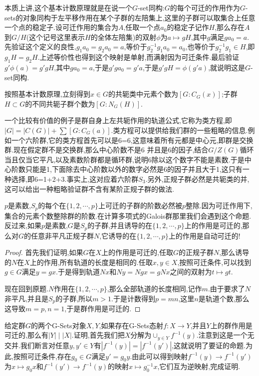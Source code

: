 本质上讲,这个基本计数原理就是在说一个$G$-set同构:$G$的每个可迁的作用作为$G$-sets的对象同构于左平移作用在某个子群的左陪集上,这里的子群可以取集合上任意一个点的稳定子.设可迁作用的集合为$A$,任取一个点$a_0$的稳定子记作$H$,那么存在$A$到$G/H$(这个记号这里表示$H$的全体左陪集)的双射$\phi$为$a\mapsto gH$,其中$g$满足$ga_0=a$.先验证这个定义的良性,$g_1a_0=g_2a_0=a$,等价于$g_2^{-1}g_1a_0=a_0$,也等价于$g_2^{-1}g_1\in H$,即$g_1H=g_2H$.上述等价性也得到这个映射是单射,而满射因为可迁条件.最后验证$g'\phi(a)=g'gH$,其中$ga_0=a$,于是$g'ga_0=g'a$,于是$g'gH=\phi(g'a)$,就说明这是$G$-set同构.

按照基本计数原理,立刻得到$x\in G$的共轭类中元素个数为$[G:C_G(x)]$;子群$H\subset G$的不同共轭子群个数为$[G:N_G(H)]$.

一个比较有价值的例子是群自身上左共轭作用的轨道公式,它称为类方程,即$|G|=|C(G)|+\sum[G:C_G(a)]$.类方程可以提供给我们群的一些粗略的信息.例如一个六阶群,它的类方程首先可以是6=6,这意味着所有元都是中心元,即群是交换群.现在假定群不是交换群,那么中心阶数不是6 并且是6的因子,结合$G/Z(G)$循环当且仅当它平凡,以及素数阶群都是循环群,说明6除以这个数字不能是素数.于是中心阶数只能是1,下面除去中心阶数以外的数字必然是6的因子并且大于1,这只有一种选择,即6=1+2+3.事实上,这对应着六阶群$S_3$.另外,正规子群必然是共轭类的并,这可以给出一种粗略验证群不含有某阶正规子群的做法.

$p$是素数,$S_p$的每个在$\{1,2,\cdots,p\}$上可迁的子群的阶数必然被$p$整除.因为可迁作用下,集合的元素个数整除群的阶数.在计算多项式的Galois群那里我们会遇到这个命题.反过来,如果$p$是素数,$G$是$S_p$的子群,并且诱导的在$\{1,2,\cdots,p\}$上的作用是可迁的,那么对$G$的任意非平凡正规子群$N$,它诱导的在$\{1,2,\cdots,p\}$上的作用是自动可迁的!
\begin{proof}
	
	首先我们证明,如果$G$在$X$上的作用是可迁的,任取$G$的正规子群$N$,那么诱导的$N$在$X$上的作用,所有轨道的长度是相同的.任取$x,y\in X$,按照可迁条件,可以找到$g\in G$满足$y=gx$.于是得到轨道$Nx$和$Ny=Ngx=gNx$之间的双射为$t\mapsto gt$.
	
	现在回到原题.$N$作用在$\{1,2,\cdots,p\}$,那么全部轨道的长度相同,记作$m$.由于要求了$N$非平凡,并且是$S_p$的子群,所以$m>1$.于是计数得到$p=mn$,这里$n$是轨道个数,那么这导致$m=p,n=1$,于是群作用是可迁的.
	
\end{proof}

给定群$G$的两个G-Sets对象$X,Y$,如果存在G-Sets态射$f:X\to Y$,并且$Y$上的群作用是可迁的,那么有$|Y|\mid |X|$.证明,首先我们把$X$分解为$\cup_{y\in Y}f^{-1}(y)$.注意到这是一个无交并.我们断言对任意$y,y'\in Y$有$|f^{-1}(y)|=|f^{-1}(y')|$,这就说明了要证的命题.为此,按照可迁条件,存在$g_0\in G$满足$y'=g_0y$.由此可以得到映射$f^{-1}(y)\to f^{-1}(y')$为$x\mapsto g_0x$和$f^{-1}(y')\to f^{-1}(y)$的映射$x\mapsto g_0^{-1}x$,它们互为逆映射,完成证明.

